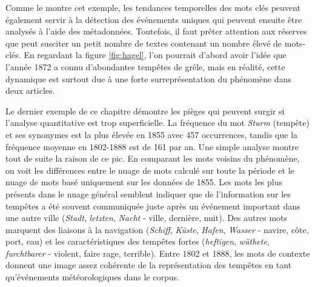 \documentclass[a4paper,twoside,12pt]{article}
\begin{document}
Comme le montre cet exemple, les tendances temporelles des mots clés peuvent également servir à la détection des événements uniques qui peuvent ensuite être analysés à l'aide des métadonnées. Toutefois, il faut prêter attention aux réserves que peut susciter un petit nombre de textes contenant un nombre élevé de mots-clés. En regardant la figure \ref{fig:hagel}, l'on pourrait d'abord avoir l'idée que l'année 1872 a connu d'abondantes tempêtes de grêle, mais en réalité, cette dynamique est surtout due à une forte surreprésentation du phénomène dans deux articles.

Le dernier exemple de ce chapitre démontre les pièges qui peuvent surgir si l'analyse quantitative est trop superficielle. La fréquence du mot \textit{Sturm} (tempête) et ses synonymes est la plus élevée en 1855 avec 457 occurrences, tandis que la fréquence moyenne en 1802-1888 est de 161 par an. Une simple analyse montre tout de suite la raison de ce pic. En comparant les mots voisins du phénomène, on voit les différences entre le nuage de mots calculé sur toute la période et le nuage de mots basé uniquement sur les données de 1855. Les mots les plus présents dans le nuage général semblent indiquer que de l'information sur les tempêtes a été souvent communiquée juste après un événement important dans une autre ville (\textit{Stadt}, \textit{letzten}, \textit{Nacht} - ville, dernière, nuit). Des autres mots marquent des liaisons à la navigation (\textit{Schiff}, \textit{Küste}, \textit{Hafen}, \textit{Wasser} - navire, côte, port, eau) et les caractéristiques des tempêtes fortes (\textit{heftigen}, \textit{wüthete}, \textit{furchtbarer} - violent, faire rage, terrible). Entre 1802 et 1888, les mots de contexte donnent une image assez cohérente de la représentation des tempêtes en tant qu'événements météorologiques dans le corpus.
\end{document}
